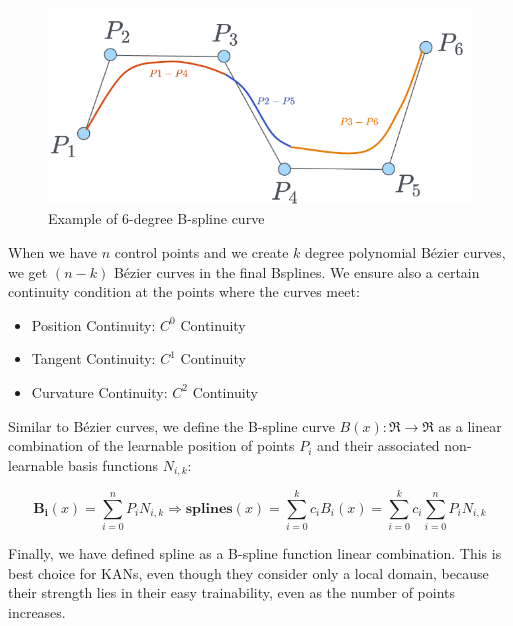 \begin{figure}[H]
    \centering
    \includegraphics[width=0.5\linewidth]{Images/bezier4.png}
    \caption{Example of 6-degree B-spline curve}
    \label{fig:bezier4}
\end{figure}

When we have $n$ control points and we create $k$ degree polynomial Bézier curves, we get $(n-k)$ Bézier curves in the final Bsplines. We ensure also a certain continuity condition at the points where the curves meet:
\begin{itemize}
    \item Position Continuity: $C^0$ Continuity 
    \item Tangent Continuity: $C^1$ Continuity  
    \item Curvature Continuity: $C^2$ Continuity 
\end{itemize}

Similar to Bézier curves, we define the B-spline curve \( B(x): \Re \to \Re \) as a linear combination of the learnable position of points \( P_i \) and their associated non-learnable basis functions \( N_{i,k} \):


\[
\mathbf{B_i}(x) = \sum_{i=0}^n P_i N_{i,k} \Rightarrow \textbf{splines}(x ) = \sum_{i=0}^k c_i B_{i}(x) = \sum_{i=0}^k c_i \sum_{i=0}^n P_i N_{i,k}
\]

Finally, we have defined spline as a B-spline function linear combination. This is best choice for KANs, even though they consider only a local domain, because their strength lies in their easy trainability, even as the number of points increases.
